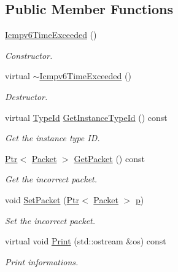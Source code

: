 \subsection*{Public Member Functions}
\begin{DoxyCompactItemize}
\item 
\hyperlink{classns3_1_1Icmpv6TimeExceeded_a71b4931147c66a34c4c77c2aeb43fa8c}{Icmpv6\+Time\+Exceeded} ()
\begin{DoxyCompactList}\small\item\em Constructor. \end{DoxyCompactList}\item 
virtual \hyperlink{classns3_1_1Icmpv6TimeExceeded_aaef7d5032cd88ca3107c93bf064752d2}{$\sim$\+Icmpv6\+Time\+Exceeded} ()
\begin{DoxyCompactList}\small\item\em Destructor. \end{DoxyCompactList}\item 
virtual \hyperlink{classns3_1_1TypeId}{Type\+Id} \hyperlink{classns3_1_1Icmpv6TimeExceeded_a293ed74318aa709884a3986cc06a2bb8}{Get\+Instance\+Type\+Id} () const 
\begin{DoxyCompactList}\small\item\em Get the instance type ID. \end{DoxyCompactList}\item 
\hyperlink{classns3_1_1Ptr}{Ptr}$<$ \hyperlink{classns3_1_1Packet}{Packet} $>$ \hyperlink{classns3_1_1Icmpv6TimeExceeded_a0b163e2da0a4ed96badf2d2b31e9149a}{Get\+Packet} () const 
\begin{DoxyCompactList}\small\item\em Get the incorrect packet. \end{DoxyCompactList}\item 
void \hyperlink{classns3_1_1Icmpv6TimeExceeded_a4ef97f56044eb277104d1ed222e0a2c0}{Set\+Packet} (\hyperlink{classns3_1_1Ptr}{Ptr}$<$ \hyperlink{classns3_1_1Packet}{Packet} $>$ \hyperlink{lte__link__budget__x2__handover__measures_8m_ac9de518908a968428863f829398a4e62}{p})
\begin{DoxyCompactList}\small\item\em Set the incorrect packet. \end{DoxyCompactList}\item 
virtual void \hyperlink{classns3_1_1Icmpv6TimeExceeded_a54cc55139ed2453038086d58594d47d9}{Print} (std\+::ostream \&os) const 
\begin{DoxyCompactList}\small\item\em Print informations. \end{DoxyCompactList}\item 

\end{DoxyCompactItemize}
